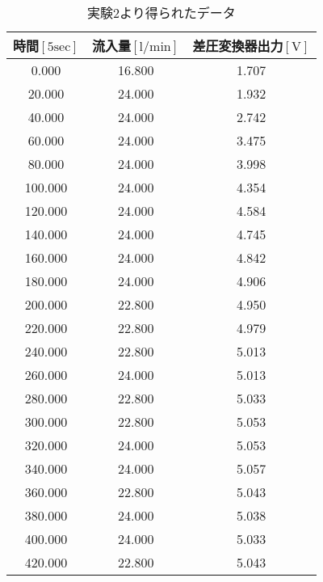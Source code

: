 \begin{table}[h]
  \begin{center}
    \caption{実験2より得られたデータ}
    \begin{tabular}{|c|c|c|} \hline
      時間$\mathrm{[5sec]}$ & 流入量$\mathrm{[l/min]}$ & 差圧変換器出力$\mathrm{[V]}$ \\ \hline \hline
      0.000   & 16.800   & 1.707 \\ \hline
      20.000  & 24.000   & 1.932 \\ \hline
      40.000  & 24.000   & 2.742 \\ \hline
      60.000  & 24.000   & 3.475 \\ \hline
      80.000  & 24.000   & 3.998 \\ \hline
      100.000	& 24.000   & 4.354 \\ \hline
      120.000	& 24.000   & 4.584 \\ \hline
      140.000	& 24.000   & 4.745 \\ \hline
      160.000	& 24.000   & 4.842 \\ \hline
      180.000	& 24.000   & 4.906 \\ \hline
      200.000	& 22.800   & 4.950 \\ \hline
      220.000	& 22.800   & 4.979 \\ \hline
      240.000	& 22.800   & 5.013 \\ \hline
      260.000	& 24.000   & 5.013 \\ \hline
      280.000	& 22.800   & 5.033 \\ \hline
      300.000	& 22.800   & 5.053 \\ \hline
      320.000	& 24.000   & 5.053 \\ \hline
      340.000	& 24.000   & 5.057 \\ \hline
      360.000	& 22.800   & 5.043 \\ \hline
      380.000	& 24.000   & 5.038 \\ \hline
      400.000	& 24.000   & 5.033 \\ \hline
      420.000	& 22.800   & 5.043 \\ \hline
    \end{tabular}
    \label{tab:data2}
  \end{center}
\end{table}
